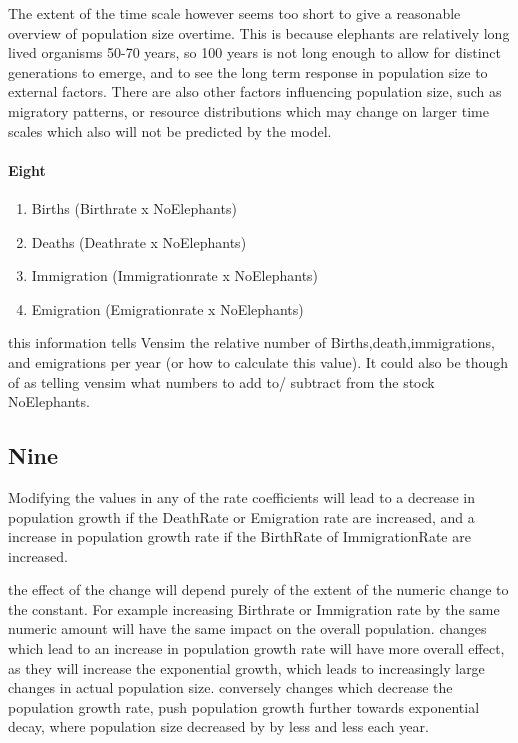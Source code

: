 \documentclass[]{article}
\let\oldparagraph\paragraph
\renewcommand{\paragraph}[1]{\oldparagraph{#1}\mbox{}}
\begin{document}
The extent of the time scale however seems too short to give a
reasonable overview of population size overtime. This is because
elephants are relatively long lived organisms 50-70 years, so 100 years
is not long enough to allow for distinct generations to emerge, and to
see the long term response in population size to external factors. There
are also other factors influencing population size, such as migratory
patterns, or resource distributions which may change on larger time
scales which also will not be predicted by the model.

\hypertarget{eight}{%
\paragraph{Eight}\label{eight}}

\begin{enumerate}
\def\labelenumi{\arabic{enumi}.}
\item
  Births (Birthrate x NoElephants)
\item
  Deaths (Deathrate x NoElephants)
\item
  Immigration (Immigrationrate x NoElephants)
\item
  Emigration (Emigrationrate x NoElephants)
\end{enumerate}

this information tells Vensim the relative number of
Births,death,immigrations, and emigrations per year (or how to calculate
this value). It could also be though of as telling vensim what numbers
to add to/ subtract from the stock NoElephants.

\hypertarget{nine}{%
\subsection{Nine}\label{nine}}

Modifying the values in any of the rate coefficients will lead to a
decrease in population growth if the DeathRate or Emigration rate are
increased, and a increase in population growth rate if the BirthRate of
ImmigrationRate are increased.

the effect of the change will depend purely of the extent of the numeric
change to the constant. For example increasing Birthrate or Immigration
rate by the same numeric amount will have the same impact on the overall
population. changes which lead to an increase in population growth rate
will have more overall effect, as they will increase the exponential
growth, which leads to increasingly large changes in actual population
size. conversely changes which decrease the population growth rate, push
population growth further towards exponential decay, where population
size decreased by by less and less each year.
\end{document}
